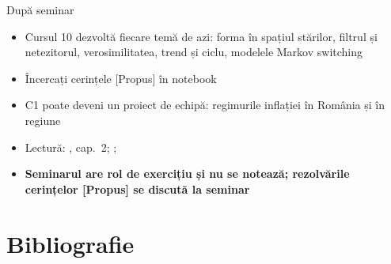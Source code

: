 \begin{frame}{După seminar}
\itemsize{\small}
\begin{itemize}
    \item Cursul 10 dezvoltă fiecare temă de azi: forma în spațiul stărilor, filtrul și netezitorul, verosimilitatea, trend și ciclu, modelele Markov switching
    \item Încercați cerințele [Propus] în notebook
    \item C1 poate deveni un proiect de echipă: regimurile inflației în România și în regiune
    \item Lectură: , cap.~2; ; 
    \item \textbf{Seminarul are rol de exercițiu și nu se notează; rezolvările cerințelor [Propus] se discută la seminar}
\end{itemize}
\end{frame}


\section{Bibliografie}

